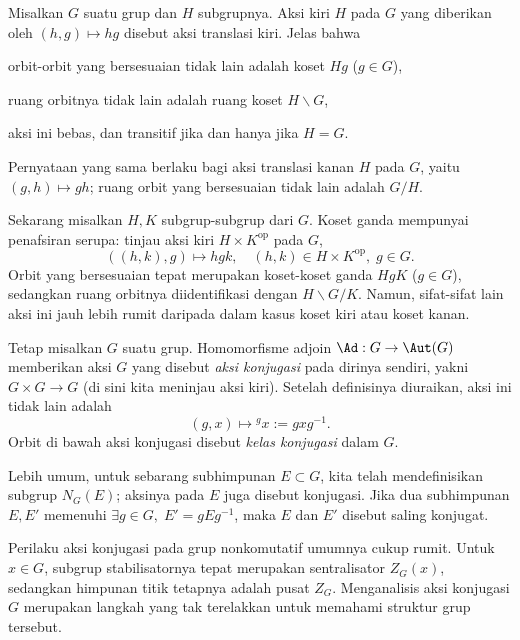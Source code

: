 \begin{example}
	Misalkan $G$ suatu grup dan $H$ subgrupnya. Aksi kiri $H$ pada $G$ yang diberikan oleh $(h, g) \mapsto hg$ disebut aksi translasi kiri. Jelas bahwa
	\begin{inparaenum}[(i)]
		\item orbit-orbit yang bersesuaian tidak lain adalah koset $Hg$ ($g \in G$),
		\item ruang orbitnya tidak lain adalah ruang koset $H \backslash G$,
		\item aksi ini bebas, dan transitif jika dan hanya jika $H=G$.
	\end{inparaenum}
	Pernyataan yang sama berlaku bagi aksi translasi kanan $H$ pada $G$, yaitu $(g,h) \mapsto gh$; ruang orbit yang bersesuaian tidak lain adalah $G/H$.

	Sekarang misalkan $H, K$ subgrup-subgrup dari $G$. Koset ganda mempunyai penafsiran serupa: tinjau aksi kiri $H \times K^\text{op}$ pada $G$,
	\[ ((h, k), g) \mapsto hgk, \quad (h, k) \in H \times K^\text{op}, \; g \in G. \]
	Orbit yang bersesuaian tepat merupakan koset-koset ganda $HgK$ ($g \in G$), sedangkan ruang orbitnya diidentifikasi dengan $H \backslash G/K$. Namun, sifat-sifat lain aksi ini jauh lebih rumit daripada dalam kasus koset kiri atau koset kanan.
\end{example}

\begin{example}\label{eg:conj-action} 
	Tetap misalkan $G$ suatu grup. Homomorfisme adjoin $\Ad: G \to \Aut(G)$ memberikan aksi $G$ yang disebut \emph{aksi konjugasi} pada dirinya sendiri, yakni $G \times G \to G$ (di sini kita meninjau aksi kiri). Setelah definisinya diuraikan, aksi ini tidak lain adalah
	\[ (g, x) \longmapsto {}^g x := gxg^{-1}. \]
	Orbit di bawah aksi konjugasi disebut \emph{kelas konjugasi} dalam $G$.

	Lebih umum, untuk sebarang subhimpunan $E \subset G$, kita telah mendefinisikan subgrup $N_G(E)$; aksinya pada $E$ juga disebut konjugasi. Jika dua subhimpunan $E, E'$ memenuhi $\exists g \in G, \; E' = gEg^{-1}$, maka $E$ dan $E'$ disebut saling konjugat.

	Perilaku aksi konjugasi pada grup nonkomutatif umumnya cukup rumit. Untuk $x \in G$, subgrup stabilisatornya tepat merupakan sentralisator $Z_G(x)$, sedangkan himpunan titik tetapnya adalah pusat $Z_G$. Menganalisis aksi konjugasi $G$ merupakan langkah yang tak terelakkan untuk memahami struktur grup tersebut.
\end{example}

